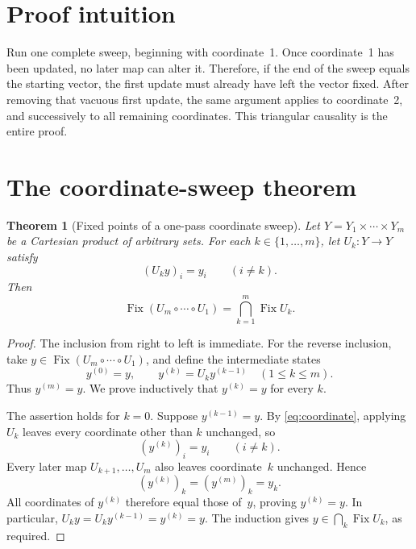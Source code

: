 \documentclass[11pt]{article}
\newtheorem{theorem}{Theorem}
\newcommand{\Fix}{\operatorname{Fix}}
\begin{document}
\section{Proof intuition}

Run one complete sweep, beginning with coordinate~1. Once coordinate~1
has been updated, no later map can alter it. Therefore, if the end of the
sweep equals the starting vector, the first update must already have left
the vector fixed. After removing that vacuous first update, the same
argument applies to coordinate~2, and successively to all remaining
coordinates. This triangular causality is the entire proof.

\section{The coordinate-sweep theorem}

\begin{theorem}[Fixed points of a one-pass coordinate sweep]
\label{thm:sweep}
Let \(Y=Y_1\times\cdots\times Y_m\) be a Cartesian product of arbitrary
sets. For each \(k\in\{1,\ldots,m\}\), let \(U_k:Y\to Y\) satisfy
\begin{equation}\label{eq:coordinate}
 (U_ky)_i=y_i\qquad(i\neq k).
\end{equation}
Then
\begin{equation}\label{eq:abstractequality}
 \Fix(U_m\circ\cdots\circ U_1)
   =\bigcap_{k=1}^m\Fix U_k.
\end{equation}
\end{theorem}

\begin{proof}
The inclusion from right to left is immediate. For the reverse inclusion,
take \(y\in\Fix(U_m\circ\cdots\circ U_1)\), and define the intermediate
states
\[
 y^{(0)}=y,
 \qquad
 y^{(k)}=U_k y^{(k-1)}\quad(1\leq k\leq m).
\]
Thus \(y^{(m)}=y\). We prove inductively that \(y^{(k)}=y\) for every
\(k\).

The assertion holds for \(k=0\). Suppose \(y^{(k-1)}=y\). By
\eqref{eq:coordinate}, applying \(U_k\) leaves every coordinate other than
\(k\) unchanged, so
\[
 (y^{(k)})_i=y_i\qquad(i\neq k).
\]
Every later map \(U_{k+1},\ldots,U_m\) also leaves coordinate~\(k\)
unchanged. Hence
\[
 (y^{(k)})_k=(y^{(m)})_k=y_k.
\]
All coordinates of \(y^{(k)}\) therefore equal those of~\(y\), proving
\(y^{(k)}=y\). In particular,
\(U_ky=U_ky^{(k-1)}=y^{(k)}=y\). The induction gives
\(y\in\bigcap_k\Fix U_k\), as required.
\end{proof}
\end{document}
